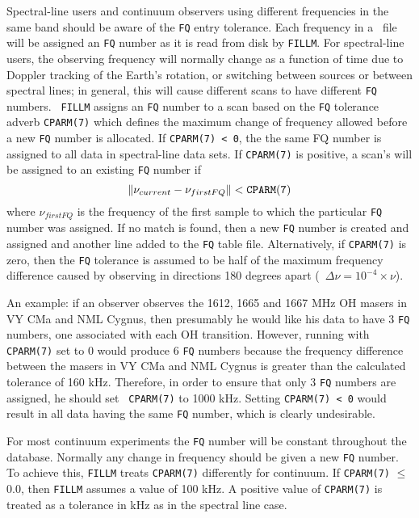       Spectral-line users and continuum observers using different
frequencies in the same band should be aware of the {\tt FQ} entry
tolerance.  Each frequency in a \uv\ file will be assigned an {\tt FQ}
number as it is read from disk by \hbox{{\tt FILLM}}.  For
spectral-line users, the observing frequency will normally change as a
function of time due to Doppler tracking of the Earth's rotation, or
switching between sources or between spectral lines; in general, this
will cause different scans to have different {\tt FQ} numbers.  {\tt
FILLM} assigns an {\tt FQ} number to a scan based on the {\tt FQ}
tolerance adverb {\tt CPARM(7)} which defines the maximum change of
frequency allowed before a new {\tt FQ} number is allocated.  If
{\tt CPARM(7) < 0}, the the same FQ number is assigned to all data in
spectral-line data sets.  If {\tt CPARM(7)} is positive, a scan's
 will be assigned to an existing {\tt FQ} number if
$$ \| \nu_{current} - \nu_{firstFQ} \| < {\tt CPARM(7)} $$
where $\nu_{firstFQ}$ is the frequency of the first sample to which
the particular {\tt FQ} number was assigned.  If no match is found,
then a new {\tt FQ} number is created and assigned and another line
added to the {\tt FQ} table file.  Alternatively, if {\tt CPARM(7)} is
zero, then the {\tt FQ} tolerance is assumed to be half of the
maximum frequency difference caused by observing in directions 180
degrees apart (\ie\ $\Delta\nu = 10^{-4}\times \nu$).

     An example: if an observer observes the 1612, 1665 and 1667 MHz
OH masers in VY CMa and NML Cygnus, then presumably he would like his
data to have 3 {\tt FQ} numbers, one associated with each OH
transition.  However, running {\tt {}} with {\tt CPARM(7)}
set to $0$ would produce 6 {\tt FQ} numbers because the frequency
difference between the masers in VY CMa and NML Cygnus is greater than
the calculated tolerance of 160 kHz.  Therefore, in order to ensure
that only 3 {\tt FQ} numbers are assigned, he should set {\tt
CPARM(7)} to 1000 kHz.  Setting {\tt CPARM(7) < 0} would result in all
data having the same {\tt FQ} number, which is clearly undesirable.

     For most continuum experiments the {\tt FQ} number will be
constant throughout the database.  Normally any change in frequency
should be given a new {\tt FQ} number.  To achieve this, {\tt FILLM}
treats {\tt CPARM(7)} differently for continuum.  If {\tt CPARM(7)}
$\leq$ 0.0, then {\tt FILLM} assumes a value of 100 kHz.  A positive
value of {\tt CPARM(7)} is treated as a tolerance in kHz as in the
spectral line case.

